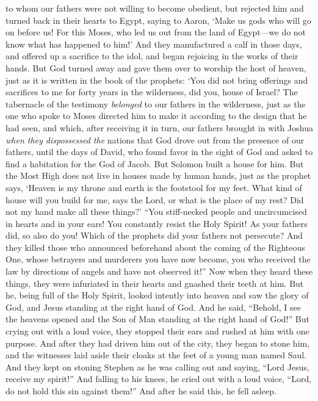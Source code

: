 \begin{biblechapter}
\verse to whom our fathers were not willing to become obedient, but rejected him and turned back in their hearts to Egypt,
\verse saying to Aaron, ‘Make us gods who will go on before us! For this Moses, who led us out from the land of Egypt—we do not know what has happened to him!’
\verse And they manufactured a calf in those days, and offered up a sacrifice to the idol, and began rejoicing in the works of their hands.
\verse But God turned away and gave them over to worship the host of heaven, just as it is written in the book of the prophets:
\verse ‘You did not bring offerings and sacrifices to me 
for forty years in the wilderness, did you, house of Israel?
\verse The tabernacle of the testimony \textit{belonged} to our fathers in the wilderness, just as the one who spoke to Moses directed him to make it according to the design that he had seen,
\verse and which, after receiving it in turn, our fathers brought in with Joshua \textit{when they dispossessed the} nations that God drove out from the presence of our fathers, until the days of David,
\verse who found favor in the sight of God and asked to find a habitation for the God of Jacob.
\verse But Solomon built a house for him.
\verse But the Most High does not live in houses made by human hands, just as the prophet says,
\verse ‘Heaven is my throne 
and earth is the footstool for my feet. 
What kind of house will you build for me, says the Lord, 
or what is the place of my rest?
\verse Did not my hand make all these things?’
\verse “You stiff-necked people and uncircumcised in hearts and in your ears! You constantly resist the Holy Spirit! As your fathers did, so also do you!
\verse Which of the prophets did your fathers not persecute? And they killed those who announced beforehand about the coming of the Righteous One, whose betrayers and murderers you have now become,
\verse you who received the law by directions of angels and have not observed it!”
 Now when they heard these things, they were infuriated in their hearts and gnashed their teeth at him.
\verse But he, being full of the Holy Spirit, looked intently into heaven and saw the glory of God, and Jesus standing at the right hand of God.
\verse And he said, “Behold, I see the heavens opened and the Son of Man standing at the right hand of God!”
\verse But crying out with a loud voice, they stopped their ears and rushed at him with one purpose.
\verse And after they had driven him out of the city, they began to stone him, and the witnesses laid aside their cloaks at the feet of a young man named Saul.
\verse And they kept on stoning Stephen as he was calling out and saying, “Lord Jesus, receive my spirit!”
\verse And falling to his knees, he cried out with a loud voice, “Lord, do not hold this sin against them!” And after he said this, he fell asleep.
\end{biblechapter}

